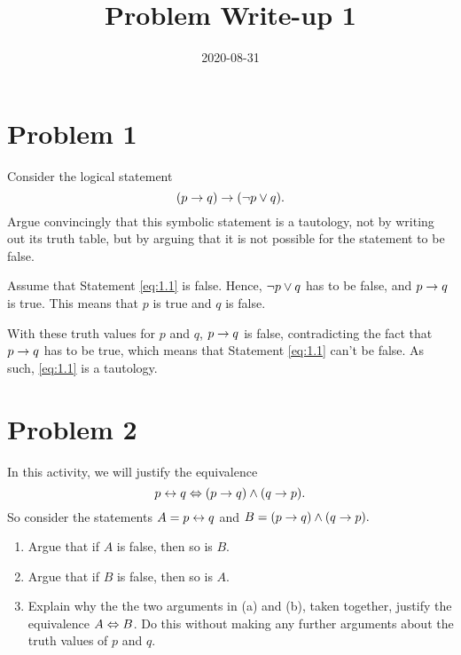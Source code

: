 \documentclass[12pt,a4paper]{article}
\title{Problem Write-up 1}
\date{2020-08-31}
\begin{document}
	\section{Problem 1}
    \begin{problem}
        Consider the logical statement
        \begin{equation} \label{eq:1.1}
        	(p \rightarrow q) \rightarrow (\neg p \vee q) \text{.}
        \end{equation}
        Argue convincingly that this symbolic statement is a tautology, not by writing out its truth table, but by arguing that it is not possible for the statement to be false.
    \end{problem}
    
    \begin{answer}
        Assume that Statement \ref{eq:1.1} is false. Hence, \(\neg p \vee q\) has to be false, and \(p \rightarrow q\) is true. This means that \(p\) is true and \(q\) is false.

       	With these truth values for \(p\) and \(q\), \(p \rightarrow q\) is false, contradicting the fact that \(p \rightarrow q\) has to be true, which means that Statement \ref{eq:1.1} can't be false. As such, \eqref{eq:1.1} is a tautology.
    \end{answer}

    \section{Problem 2}
    \begin{problem}
        In this activity, we will justify the equivalence
        \begin{equation} \label{eq:2.1}
        	p \leftrightarrow q \Leftrightarrow (p\rightarrow q) \wedge (q \rightarrow p) \text{.}
        \end{equation}
        So consider the statements \(A = p \leftrightarrow q\) and \(B = (p\rightarrow q) \wedge (q \rightarrow p)\text{.}\)

        \begin{enumerate}
        	\item Argue that if \(A\) is false, then so is \(B\).
        	\item Argue that if \(B\) is false, then so is \(A\).
        	\item Explain why the the two arguments in (a) and (b), taken together, justify the equivalence \(A \Leftrightarrow B\).  
        	Do this without making any further arguments about the truth values of \(p\) and \(q\).
        \end{enumerate}
    \end{problem}
    
\end{document}
